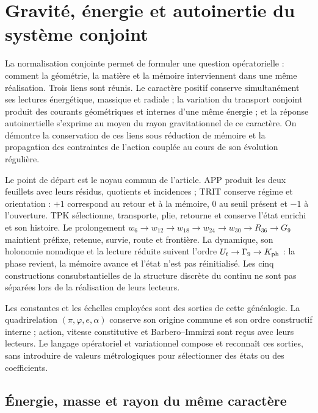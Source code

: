 \section{Gravité, énergie et autoinertie du système conjoint}
\label{hmtcuatro:gea:seccion}

La normalisation conjointe permet de formuler une question opératorielle : comment la géométrie, la matière et la mémoire interviennent dans une même réalisation. Trois liens sont réunis. Le caractère positif conserve simultanément ses lectures énergétique, massique et radiale ; la variation du transport conjoint produit des courants géométriques et internes d’une même énergie ; et la réponse autoinertielle s’exprime au moyen du rayon gravitationnel de ce caractère. On démontre la conservation de ces liens sous réduction de mémoire et la propagation des contraintes de l’action couplée au cours de son évolution régulière.

Le point de départ est le noyau commun de l’article. APP produit les deux feuillets avec leurs résidus, quotients et incidences ; TRIT conserve régime et orientation : $+1$ correspond au retour et à la mémoire, $0$ au seuil présent et $-1$ à l’ouverture. TPK sélectionne, transporte, plie, retourne et conserve l’état enrichi et son histoire. Le prolongement $w_6\to w_{12}\to w_{18}\to w_{24}\to w_{30}\to R_{36}\to G_9$ maintient préfixe, retenue, survie, route et frontière. La dynamique, son holonomie nonadique et la lecture réduite suivent l’ordre $U_t\to\Gamma_9\to K_{\rm ph}$ : la phase revient, la mémoire avance et l’état n’est pas réinitialisé. Les cinq constructions consubstantielles de la structure discrète du continu ne sont pas séparées lors de la réalisation de leurs lecteurs.

Les constantes et les échelles employées sont des sorties de cette généalogie. La quadrirelation $(\pi,\varphi,e,\alpha)$ conserve son origine commune et son ordre constructif interne ; action, vitesse constitutive et Barbero--Immirzi sont reçus avec leurs lecteurs. Le langage opératoriel et variationnel compose et reconnaît ces sorties, sans introduire de valeurs métrologiques pour sélectionner des états ou des coefficients.

\subsection{Énergie, masse et rayon du même caractère}
\label{hmtcuatro:gea:caracter}

